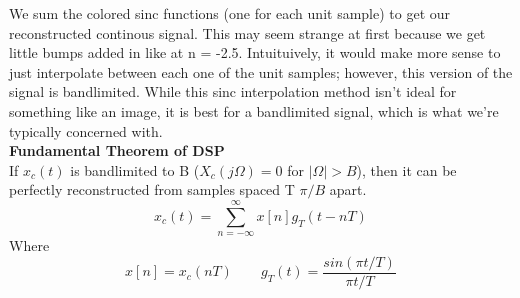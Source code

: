 \documentclass[12pt]{article}
\begin{document}
\noindent We sum the colored sinc functions (one for each unit sample) to get our reconstructed continous signal. This may seem strange at first because we get little bumps added in like at n = -2.5. Intuituively, it would make more sense to just interpolate between each one of the unit samples; however, this version of the signal is bandlimited. While this sinc interpolation method isn't ideal for something like an image, it is best for a bandlimited signal, which is what we're typically concerned with. \\
\color{ForestGreen}
\large{\textbf{Fundamental Theorem of DSP}}
\color{Black}\\
\noindent If $x_c(t)$ is bandlimited to B ($X_c(j \Omega) = 0$ for $|\Omega| > B$), then it can be perfectly reconstructed from samples spaced T \leq $\pi /B$ apart. 
\begin{equation}
    x_c(t) = \sum_{n=-\infty}^{\infty}x[n]g_T(t-nT)
\end{equation}
Where 
\begin{equation*}
    x[n] = x_c(nT) \qquad g_T(t) = \frac{sin(\pi t/T)}{\pi t/T}
\end{equation*}
\end{document}
